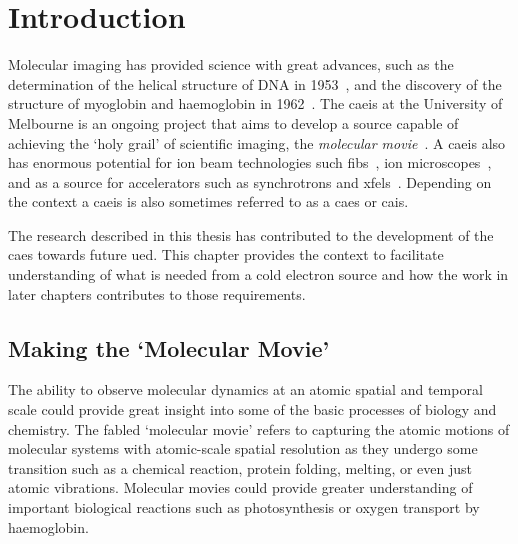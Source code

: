 \chapter{Introduction}
 
\setcounter{page}{1}

Molecular imaging has provided science with great advances, such as the determination of the helical structure of DNA in 1953~\cite{watson_molecular_1953}, and the discovery of the structure of myoglobin and haemoglobin in 1962~\cite{kendrew_x-ray_1957}.
The \gls{caeis} at the University of Melbourne is an ongoing project that aims to develop a source capable of achieving the `holy grail' of scientific imaging, the \emph{molecular movie}~\cite{dwyer_femtosecond_2006,sciaini_femtosecond_2011}.
A \gls{caeis} also has enormous potential for ion beam technologies such \glspl{fib}~\cite{mcclelland_bright_2016}, ion microscopes~\cite{knuffman_cold_2013}, and as a source for accelerators such as synchrotrons and \glspl{xfel}~\cite{van_oudheusden_electron_2007,zhu_future_2015,mcculloch_cold_2016}.
Depending on the context a \gls{caeis} is also sometimes referred to as a \gls{caes} or \gls{cais}.

The research described in this thesis has contributed to the development of the \gls{caes} towards future \gls{ued}.
This chapter provides the context to facilitate understanding of what is needed from a cold electron source and how the work in later chapters contributes to those requirements.

\section{Making the `Molecular Movie'}

The ability to observe molecular dynamics at an atomic spatial and temporal scale could provide great insight into some of the basic processes of biology and chemistry.
The fabled `molecular movie' refers to capturing the atomic motions of molecular systems with atomic-scale spatial resolution as they undergo some transition such as a chemical reaction, protein folding, melting, or even just atomic vibrations.
Molecular movies could provide greater understanding of important biological reactions such as photosynthesis or oxygen transport by haemoglobin.

